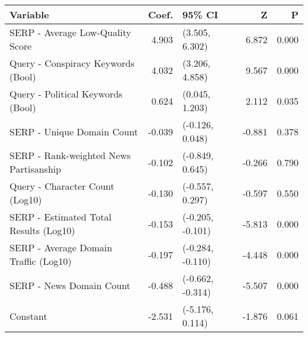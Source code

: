 \begin{tabular}{>{\raggedright\arraybackslash}p{7cm}rlrr}
\toprule
\textbf{Variable} & \textbf{Coef.} & \textbf{95\% CI} & \textbf{Z} & \textbf{P} \\
\midrule
SERP - Average Low-Quality Score & 4.903 & (3.505, 6.302) & 6.872 & 0.000 \\
Query - Conspiracy Keywords (Bool) & 4.032 & (3.206, 4.858) & 9.567 & 0.000 \\
Query - Political Keywords (Bool) & 0.624 & (0.045, 1.203) & 2.112 & 0.035 \\
SERP - Unique Domain Count & -0.039 & (-0.126, 0.048) & -0.881 & 0.378 \\
SERP - Rank-weighted News Partisanship & -0.102 & (-0.849, 0.645) & -0.266 & 0.790 \\
Query - Character Count (Log10) & -0.130 & (-0.557, 0.297) & -0.597 & 0.550 \\
SERP - Estimated Total Results (Log10) & -0.153 & (-0.205, -0.101) & -5.813 & 0.000 \\
SERP - Average Domain Traffic (Log10) & -0.197 & (-0.284, -0.110) & -4.448 & 0.000 \\
SERP - News Domain Count & -0.488 & (-0.662, -0.314) & -5.507 & 0.000 \\
Constant & -2.531 & (-5.176, 0.114) & -1.876 & 0.061 \\
\bottomrule
\end{tabular}
